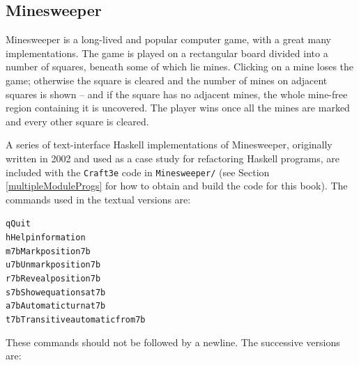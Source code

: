 \subsection*{Minesweeper}
\label{MinesweeperApp}

Minesweeper is a long-lived and popular computer game, with a great many implementations. The game is played on a rectangular board divided into a number of squares, beneath some of which lie mines. Clicking on a mine loses the game; otherwise the square is cleared and the number of mines on adjacent squares is shown -- and if the square has no adjacent mines, the whole mine-free region containing it is uncovered. The player wins once all the mines are marked and every other square is cleared.

A series of text-interface Haskell implementations of Minesweeper, originally written in 2002 and used as a case study for refactoring Haskell programs, are included with the \texttt{Craft3e} code in \texttt{Minesweeper/} (see Section \ref{multipleModuleProgs} for how to obtain and build the code for this book). The commands used in the textual versions are:
\begin{alltt}
q            Quit
h            Help information
m7b          Mark position 7b
u7b          Unmark position 7b
r7b          Reveal position 7b
s7b          Show equations at 7b
a7b          Automatic turn at 7b
t7b          Transitive automatic from 7b
\end{alltt}
These commands should not be followed by a newline. The successive versions are:
